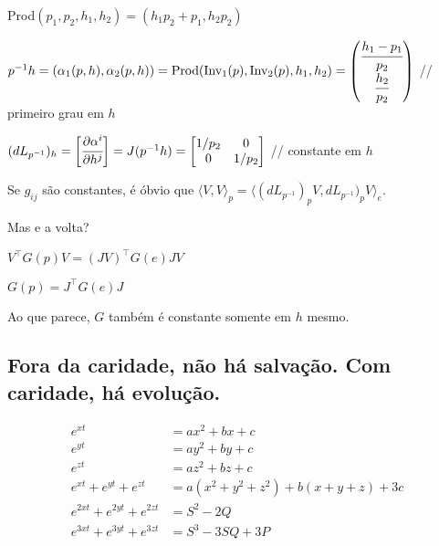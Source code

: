 \documentclass[12pt]{article}
\begin{document}
		Prod$(p_1, p_2, h_1, h_2) = (h_1 p_2 + p_1, h_2 p_2)$

		$p^{-1}h = (\alpha_1(p,h), \alpha_2(p,h))	= \text{Prod}(\text{Inv}_1(p), \text{Inv}_2(p), h_1, h_2) = \left( \begin{matrix} \cfrac{h_1 - p_1}{p_2} \\ \cfrac{h_2}{p_2} \end{matrix} \right)$ // primeiro grau em $h$

		$(dL_{p^{-1}})_h = \bigg[\cfrac{\partial \alpha^i}{\partial h^j} \bigg] = J(p^{-1}h) = \left[ \begin{matrix} 1/p_2 & 0 \\ 0 & 1/p_2 \end{matrix} \right]$ // constante em $h$

		Se $g_{ij}$ s\~ao constantes, \'e \'obvio que $\langle V, V \rangle_p = \langle (dL_{p^{-1}})_p V, dL_{p^{-1}})_p V\rangle_e$.

		Mas e a volta?

		$V^\top G(p) V = (JV)^\top G(e) JV$

		$G(p) = J^\top G(e) J$

		Ao que parece, $G$ tamb\'em \'e constante somente em $h$ mesmo.

		\subsection{Fora da caridade, n\~ao h\'a salva\c{c}\~ao. Com caridade, h\'a evolu\c{c}\~ao.}

	\begin{align}
		e^{xt} &= ax^2 + bx + c \\
		e^{yt} &= ay^2 + by + c \\
		e^{zt} &= az^2 + bz + c \\
		e^{xt} + e^{yt} + e^{zt} &= a(x^2 + y^2 + z^2) + b(x + y + z) + 3c \\
		e^{2xt} + e^{2yt} + e^{2zt} &= S^2 - 2Q \\
		e^{3xt} + e^{3yt} + e^{3zt} &= S^3 - 3SQ + 3P
	\end{align}
\end{document}
